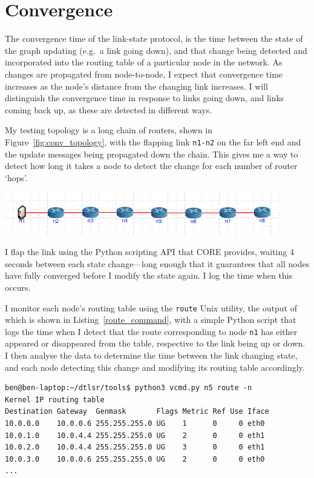 \documentclass[withindex,glossary,openany]{cam-thesis}
\begin{document}
\section{Convergence}

The convergence time of the link-state protocol, is the time between the state of the graph updating (e.g.\ a link going down), and that change being detected and incorporated into the routing table of a particular node in the network. As changes are propagated from node-to-node, I expect that convergence time increases as the node's distance from the changing link increases. I will distinguish the convergence time in response to links going down, and links coming back up, as these are detected in different ways. 

My testing topology is a long chain of routers, shown in Figure~\ref{fig:conv_topology}, with the flapping link \texttt{n1-n2} on the far left end and the update messages being propagated down the chain. This gives me a way to detect how long it takes a node to detect the change for each number of router `hops'.

\begin{minipage}{1\textwidth} \centering
	\includegraphics[width=0.9\textwidth]{conv_topology}
	\label{fig:conv_topology}
\end{minipage}

I flap the link using the Python scripting API that CORE provides, waiting 4 seconds between each state change---long enough that it guarantees that all nodes have fully converged before I modify the state again. I log the time when this occurs.

I monitor each node's routing table using the \texttt{route} Unix utility, the output of which is shown in Listing~\ref{route_command}, with a simple Python script that logs the time when I detect that the route corresponding to node \texttt{n1} has either appeared or disappeared from the table, respective to the link being up or down. I then analyse the data to determine the time between the link changing state, and each node detecting this change and modifying its routing table accordingly.

\begin{lstlisting}[label=route_command, caption=Example routing table of virtualised node, frame=tb]
ben@ben-laptop:~/dtlsr/tools$ python3 vcmd.py n5 route -n
Kernel IP routing table
Destination Gateway  Genmask       Flags Metric Ref Use Iface
10.0.0.0    10.0.0.6 255.255.255.0 UG    1      0     0 eth0
10.0.1.0    10.0.4.4 255.255.255.0 UG    2      0     0 eth1
10.0.2.0    10.0.4.4 255.255.255.0 UG    3      0     0 eth1
10.0.3.0    10.0.0.6 255.255.255.0 UG    2      0     0 eth0
...       
\end{lstlisting}
\end{document}
